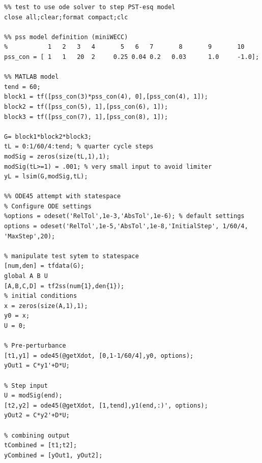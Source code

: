 \documentclass[12pt]{article}
\begin{document}
\pagebreak
\begin{verbatim}
%% test to use ode solver to step PST-esq model
close all;clear;format compact;clc

%% pss model definition (miniWECC)
%           1   2   3   4       5   6   7       8       9       10
pss_con = [ 1  	1   20  2     0.25 0.04 0.2   0.03      1.0     -1.0];

%% MATLAB model
tend = 60;
block1 = tf([pss_con(3)*pss_con(4), 0],[pss_con(4), 1]);
block2 = tf([pss_con(5), 1],[pss_con(6), 1]);
block3 = tf([pss_con(7), 1],[pss_con(8), 1]);

G= block1*block2*block3;
tL = 0:1/60/4:tend; % quarter cycle steps
modSig = zeros(size(tL,1),1);
modSig(tL>=1) = .001; % very small input to avoid limiter
yL = lsim(G,modSig,tL);

%% ODE45 attempt with statespace
% Configure ODE settings
%options = odeset('RelTol',1e-3,'AbsTol',1e-6); % default settings
options = odeset('RelTol',1e-5,'AbsTol',1e-8,'InitialStep', 1/60/4, 'MaxStep',20);

% manipulate test sytem to statespace
[num,den] = tfdata(G);
global A B U
[A,B,C,D] = tf2ss(num{1},den{1});
% initial conditions
x = zeros(size(A,1),1);
y0 = x;
U = 0;

% Pre-perturbance
[t1,y1] = ode45(@getXdot, [0,1-1/60/4],y0, options);
yOut1 = C*y1'+D*U;

% Step input
U = modSig(end);
[t2,y2] = ode45(@getXdot, [1,tend],y1(end,:)', options); 
yOut2 = C*y2'+D*U;

% combining output
tCombined = [t1;t2];
yCombined = [yOut1, yOut2];		
\end{verbatim}
\end{document}
